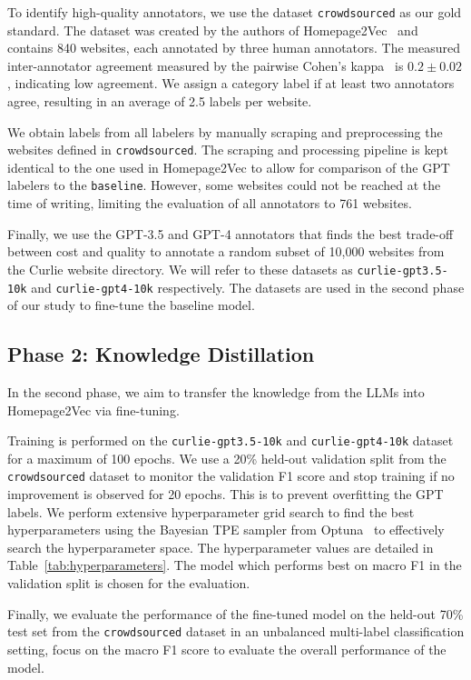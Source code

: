 To identify high-quality annotators, we use the dataset \texttt{crowdsourced} as our gold standard. The dataset was created by the authors of Homepage2Vec~\cite{homepage2vec} and contains 840 websites, each annotated by three human annotators. The measured inter-annotator agreement measured by the pairwise Cohen's kappa~\cite{cohen-coef} is $0.2 \pm 0.02$, indicating low agreement. We assign a category label if at least two annotators agree, resulting in an average of 2.5 labels per website.

We obtain labels from all labelers by manually scraping and preprocessing the websites defined in \texttt{crowdsourced}. The scraping and processing pipeline is kept identical to the one used in Homepage2Vec to allow for comparison of the GPT labelers to the \texttt{baseline}. However, some websites could not be reached at the time of writing, limiting the evaluation of all annotators to 761 websites.

Finally, we use the GPT-3.5 and GPT-4 annotators that finds the best trade-off between cost and quality to annotate a random subset of 10,000 websites from the Curlie website directory. We will refer to these datasets as \texttt{curlie-gpt3.5-10k} and \texttt{curlie-gpt4-10k} respectively. The datasets are used in the second phase of our study to fine-tune the baseline model.

\subsection* {Phase 2: Knowledge Distillation}

In the second phase, we aim to transfer the knowledge from the LLMs into Homepage2Vec via fine-tuning.

Training is performed on the \texttt{curlie-gpt3.5-10k} and \texttt{curlie-gpt4-10k} dataset for a maximum of 100 epochs. We use a 20\% held-out validation split from the \texttt{crowdsourced} dataset
to monitor the validation F1 score and stop training if no improvement is observed for 20 epochs. This is to prevent overfitting the GPT labels. We perform extensive hyperparameter grid search to find the best hyperparameters using the Bayesian TPE sampler from Optuna~\cite{optuna} to effectively search the hyperparameter space. The hyperparameter values are detailed in Table~\ref{tab:hyperparameters}. The model which performs best on macro F1 in the validation split is chosen for the evaluation.



Finally, we evaluate the performance of the fine-tuned model on the held-out 70\% test set from the \texttt{crowdsourced} dataset in an unbalanced multi-label classification setting, focus on the macro F1 score to evaluate the overall performance of the model.
